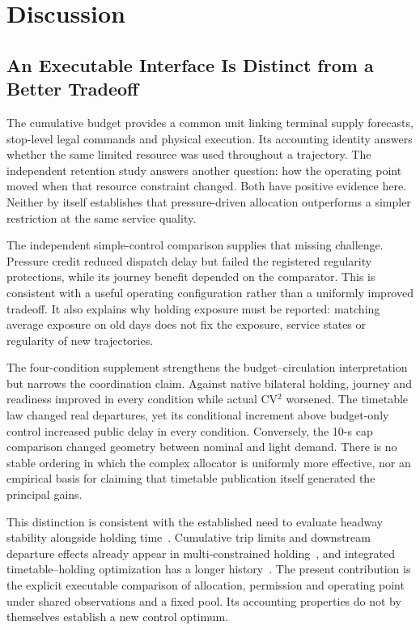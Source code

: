 \section{Discussion}
\subsection{An Executable Interface Is Distinct from a Better Tradeoff}
The cumulative budget provides a common unit linking terminal supply forecasts, stop-level legal commands and physical execution. Its accounting identity answers whether the same limited resource was used throughout a trajectory. The independent retention study answers another question: how the operating point moved when that resource constraint changed. Both have positive evidence here. Neither by itself establishes that pressure-driven allocation outperforms a simpler restriction at the same service quality.

The independent simple-control comparison supplies that missing challenge. Pressure credit reduced dispatch delay but failed the registered regularity protections, while its journey benefit depended on the comparator. This is consistent with a useful operating configuration rather than a uniformly improved tradeoff. It also explains why holding exposure must be reported: matching average exposure on old days does not fix the exposure, service states or regularity of new trajectories.

The four-condition supplement strengthens the budget--circulation interpretation but narrows the coordination claim. Against native bilateral holding, journey and readiness improved in every condition while actual CV$^2$ worsened. The timetable law changed real departures, yet its conditional increment above budget-only control increased public delay in every condition. Conversely, the 10-s cap comparison changed geometry between nominal and light demand. There is no stable ordering in which the complex allocator is uniformly more effective, nor an empirical basis for claiming that timetable publication itself generated the principal gains.

This distinction is consistent with the established need to evaluate headway stability alongside holding time~\cite{berrebi2018comparing}. Cumulative trip limits and downstream departure effects already appear in multi-constrained holding~\cite{gkiotsalitis2019multiconstrained}, and integrated timetable--holding optimization has a longer history~\cite{liu2018integrated,gkiotsalitis2021rescheduling}. The present contribution is the explicit executable comparison of allocation, permission and operating point under shared observations and a fixed pool. Its accounting properties do not by themselves establish a new control optimum.

